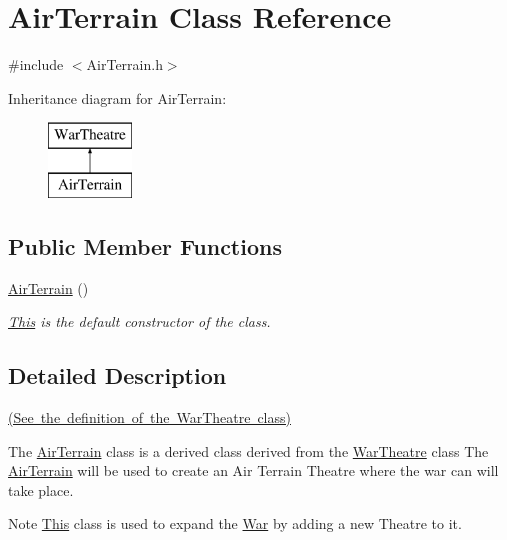 \hypertarget{class_air_terrain}{}\section{Air\+Terrain Class Reference}
\label{class_air_terrain}


{\ttfamily \#include $<$Air\+Terrain.\+h$>$}

Inheritance diagram for Air\+Terrain\+:\begin{figure}[H]
\begin{center}
\leavevmode
\includegraphics[height=2.000000cm]{class_air_terrain}
\end{center}
\end{figure}
\subsection*{Public Member Functions}
\begin{DoxyCompactItemize}
\item 
\mbox{\hyperlink{class_air_terrain_a360ac3a742f9d2155aad310cc6fa093f}{Air\+Terrain}} ()
\begin{DoxyCompactList}\small\item\em \mbox{\hyperlink{class_this}{This}} is the default constructor of the class. \end{DoxyCompactList}\end{DoxyCompactItemize}


\subsection{Detailed Description}
\mbox{\hyperlink{_war_theatre_8h_source}{(See the definition of the War\+Theatre class)}}

The \mbox{\hyperlink{class_air_terrain}{Air\+Terrain}} class is a derived class derived from the \mbox{\hyperlink{class_war_theatre}{War\+Theatre}} class The \mbox{\hyperlink{class_air_terrain}{Air\+Terrain}} will be used to create an Air Terrain Theatre where the war can will take place. \begin{DoxyNote}{Note}
\mbox{\hyperlink{class_this}{This}} class is used to expand the \mbox{\hyperlink{class_war}{War}} by adding a new Theatre to it. 
\end{DoxyNote}


